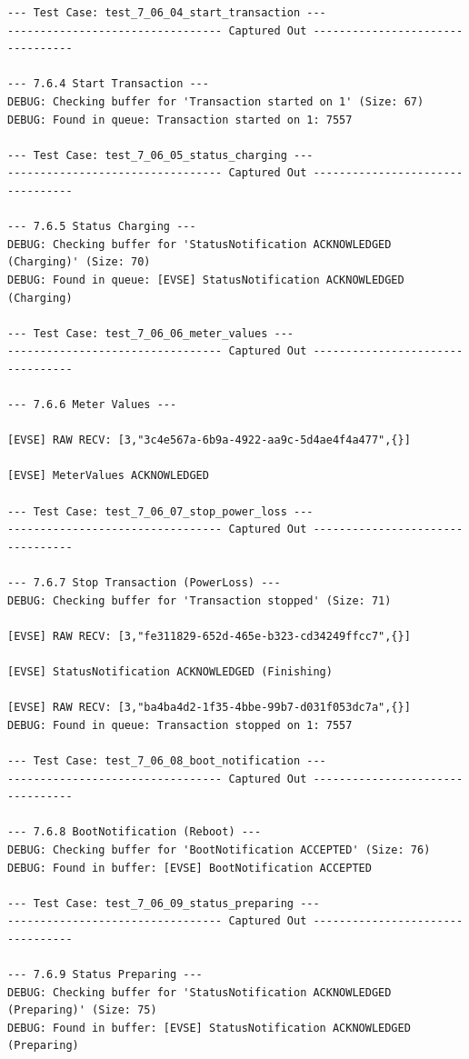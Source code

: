 \documentclass{article}
\begin{document}
\begin{lstlisting}
--- Test Case: test_7_06_04_start_transaction ---
--------------------------------- Captured Out ---------------------------------

--- 7.6.4 Start Transaction ---
DEBUG: Checking buffer for 'Transaction started on 1' (Size: 67)
DEBUG: Found in queue: Transaction started on 1: 7557

--- Test Case: test_7_06_05_status_charging ---
--------------------------------- Captured Out ---------------------------------

--- 7.6.5 Status Charging ---
DEBUG: Checking buffer for 'StatusNotification ACKNOWLEDGED (Charging)' (Size: 70)
DEBUG: Found in queue: [EVSE] StatusNotification ACKNOWLEDGED (Charging)

--- Test Case: test_7_06_06_meter_values ---
--------------------------------- Captured Out ---------------------------------

--- 7.6.6 Meter Values ---

[EVSE] RAW RECV: [3,"3c4e567a-6b9a-4922-aa9c-5d4ae4f4a477",{}]

[EVSE] MeterValues ACKNOWLEDGED

--- Test Case: test_7_06_07_stop_power_loss ---
--------------------------------- Captured Out ---------------------------------

--- 7.6.7 Stop Transaction (PowerLoss) ---
DEBUG: Checking buffer for 'Transaction stopped' (Size: 71)

[EVSE] RAW RECV: [3,"fe311829-652d-465e-b323-cd34249ffcc7",{}]

[EVSE] StatusNotification ACKNOWLEDGED (Finishing)

[EVSE] RAW RECV: [3,"ba4ba4d2-1f35-4bbe-99b7-d031f053dc7a",{}]
DEBUG: Found in queue: Transaction stopped on 1: 7557

--- Test Case: test_7_06_08_boot_notification ---
--------------------------------- Captured Out ---------------------------------

--- 7.6.8 BootNotification (Reboot) ---
DEBUG: Checking buffer for 'BootNotification ACCEPTED' (Size: 76)
DEBUG: Found in buffer: [EVSE] BootNotification ACCEPTED

--- Test Case: test_7_06_09_status_preparing ---
--------------------------------- Captured Out ---------------------------------

--- 7.6.9 Status Preparing ---
DEBUG: Checking buffer for 'StatusNotification ACKNOWLEDGED (Preparing)' (Size: 75)
DEBUG: Found in buffer: [EVSE] StatusNotification ACKNOWLEDGED (Preparing)


\end{lstlisting}
\end{document}
